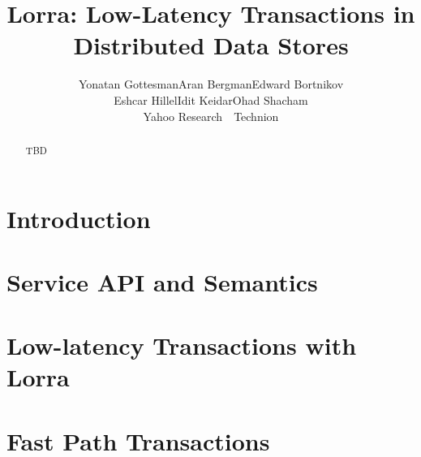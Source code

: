 \documentclass[letterpaper,twocolumn,10pt]{article}
\newcommand{\tb}{\hspace{5mm}}
\newcommand{\sys}{Lorra}
\begin{document}
\date{}

\title{\Large \bf\sys: Low-Latency Transactions in Distributed Data Stores}

\author{
{\rm Yonatan Gottesman\footnotemark[1]\tb Aran Bergman\footnotemark[2]\tb   Edward Bortnikov\footnotemark[1] }\\ 
{\rm Eshcar Hillel\footnotemark[1]\tb Idit Keidar\footnotemark[1] \footnotemark[2]\tb Ohad Shacham\footnotemark[1]}\\
	\footnotemark[1] Yahoo Research\ \ \footnotemark[2] Technion
} %


\maketitle




\begin{abstract}
TBD
\end{abstract}


\section{Introduction} \label{sec:intro}
%
 

\section{Service API and Semantics} \label{sec:api}



\section{Low-latency Transactions with \sys} \label{sec:ll}



\section{Fast Path Transactions}
\label{sec:alg}



\end{document}
